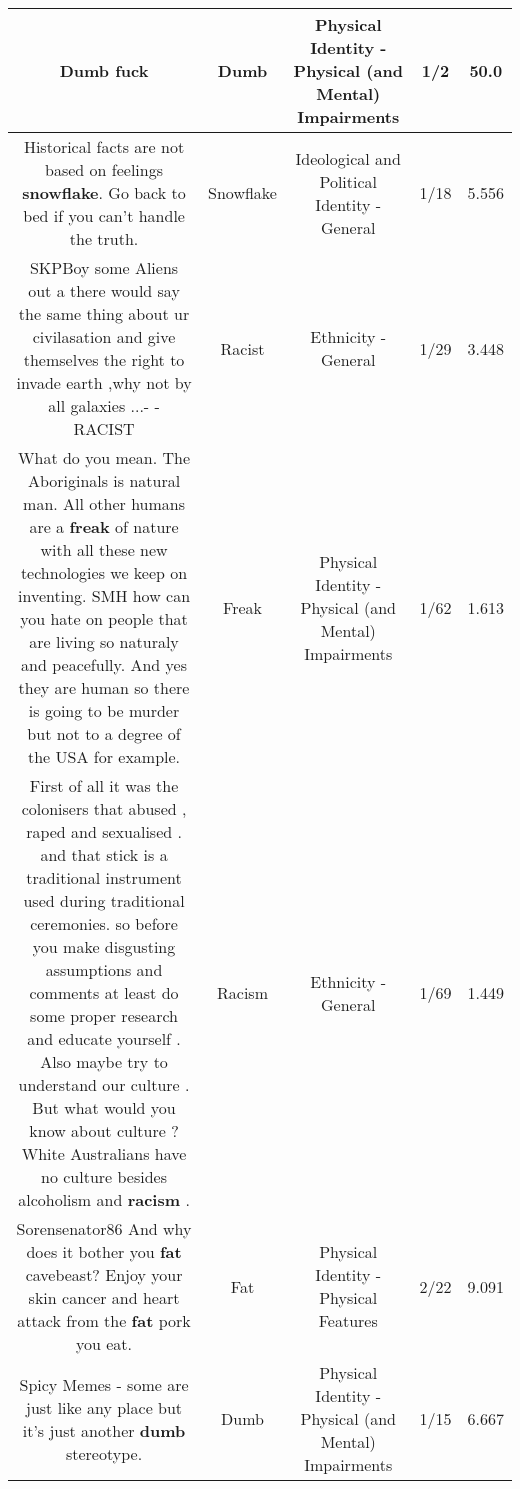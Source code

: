 \documentclass[11pt]{article}
\newlength\mylength
\begin{document}
\begin{center}
\begin{longtable}{|C{.65\mylength}|C{.30\mylength}|C{.12\mylength}|C{.12\mylength}|C{.12\mylength}|}
  \small Dumb fuck\normalsize   & Dumb & Physical Identity - Physical (and Mental) Impairments & 1/2 & 50.0 \\  \hline
  \small Historical facts are not based on feelings \textbf{snowflake}. Go back to bed if you can't handle the truth.\normalsize   & Snowflake &  Ideological and Political Identity - General & 1/18 & 5.556 \\  \hline
  \small SKPBoy some Aliens out a there would say the same thing about ur civilasation and give themselves the right to invade earth ,why not by all galaxies ...-  - RACIST\normalsize   & Racist & Ethnicity - General & 1/29 & 3.448 \\  \hline
  \small What do you mean. The Aboriginals is natural man. All other humans are a \textbf{freak} of nature with all these new technologies we  keep on inventing. SMH how can you hate on people that are living so naturaly and peacefully. And yes they are human so there is going to be murder but not to a degree of the USA for example.\normalsize   & Freak & Physical Identity - Physical (and Mental) Impairments & 1/62 & 1.613 \\  \hline
  \small First of all it was the colonisers that  abused , raped and sexualised . and that stick is a traditional instrument used during traditional ceremonies. so before you make disgusting assumptions and comments at least do some proper research and educate yourself . Also maybe try to understand our culture . But what would you know about culture ? White Australians have no culture besides alcoholism and \textbf{racism} .\normalsize   & Racism & Ethnicity - General & 1/69 & 1.449 \\  \hline
  \small Sorensenator86 And why does it bother you \textbf{fat} cavebeast? Enjoy your skin cancer and heart attack from the \textbf{fat} pork you eat.\normalsize   & Fat & Physical Identity - Physical Features & 2/22 & 9.091 \\  \hline
  \small Spicy Memes - some are just like any place but it's just another \textbf{dumb} stereotype.\normalsize   & Dumb & Physical Identity - Physical (and Mental) Impairments & 1/15 & 6.667 \\  \hline

\end{longtable}
\end{center}
\end{document}
